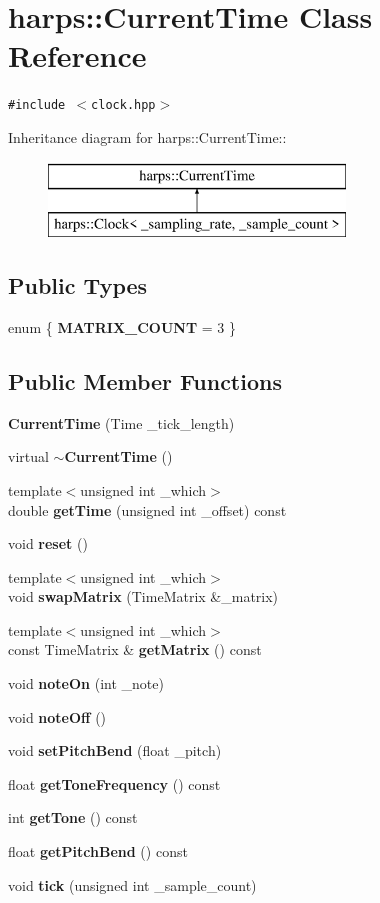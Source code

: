 \section{harps::CurrentTime Class Reference}
\label{classharps_1_1CurrentTime}
{\tt \#include $<$clock.hpp$>$}

Inheritance diagram for harps::CurrentTime::\begin{figure}[H]
\begin{center}
\leavevmode
\includegraphics[height=2cm]{classharps_1_1CurrentTime}
\end{center}
\end{figure}
\subsection*{Public Types}
\begin{CompactItemize}
\item 
enum \{ \textbf{MATRIX\_\-COUNT} =  3
 \}
\end{CompactItemize}
\subsection*{Public Member Functions}
\begin{CompactItemize}
\item 
{\bf CurrentTime} (Time \_\-tick\_\-length)
\item 
virtual {\bf $\sim$CurrentTime} ()
\item 
{\footnotesize template$<$unsigned int \_\-which$>$ }\\double {\bf getTime} (unsigned int \_\-offset) const 
\item 
void {\bf reset} ()
\item 
{\footnotesize template$<$unsigned int \_\-which$>$ }\\void {\bf swapMatrix} (TimeMatrix \&\_\-matrix)
\item 
{\footnotesize template$<$unsigned int \_\-which$>$ }\\const TimeMatrix \& {\bf getMatrix} () const 
\item 
void {\bf noteOn} (int \_\-note)
\item 
void {\bf noteOff} ()
\item 
void {\bf setPitchBend} (float \_\-pitch)
\item 
float {\bf getToneFrequency} () const 
\item 
int {\bf getTone} () const 
\item 
float {\bf getPitchBend} () const 
\item 
void {\bf tick} (unsigned int \_\-sample\_\-count)
\end{CompactItemize}


